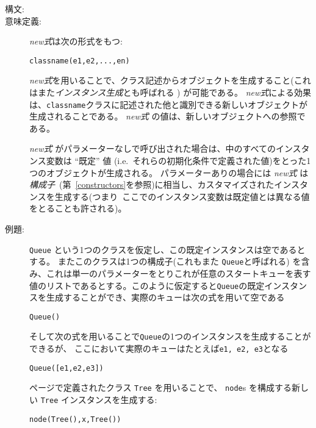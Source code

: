 \documentclass[\pformat,12pt]{jarticle}
\begin{document}
\begin{description}
\item[構文:] 

\item[意味定義:]  {\it new式}は次の形式をもつ:

  \begin{alltt}
     classname(e1, e2, ..., en)
  \end{alltt}
{\it new式}を用いることで、クラス記述からオブジェクトを生成すること(これはまた{\em インスタンス生成}とも呼ばれる ) が可能である。
 {\it new式}による効果は、{\tt classname}クラスに記述された他と識別できる新しいオブジェクトが生成されることである。
{\it new式} の値は、新しいオブジェクトへの参照である。

{\it new式} がパラメーターなしで呼び出された場合は、中のすべてのインスタンス変数は ``既定'' 値 (i.e.\ それらの初期化条件で定義された値)をとった1つのオブジェクトが生成される。
パラメーターありの場合には {\it new式} は  \emph{構成子}~(第~\ref{constructors}を参照)に相当し、カスタマイズされたインスタンスを生成する(つまり\ ここでのインスタンス変数は既定値とは異なる値をとることも許される)。


\item[例題:] \texttt{Queue} という1つのクラスを仮定し、この既定インスタンスは空であるとする。
 またこのクラスは1つの構成子(これもまた \texttt{Queue}と呼ばれる) を含み、これは単一のパラメーターをとりこれが任意のスタートキューを表す値のリストであるとする。このように仮定すると\texttt{Queue}の既定インスタンスを生成することができ、実際のキューは次の式を用いて空である
\begin{alltt}
   Queue()
\end{alltt}
そして次の式を用いることで\texttt{Queue}の1つのインスタンスを生成することができるが、 ここにおいて実際のキューはたとえば\texttt{e1, e2, e3}となる
\begin{alltt}
   Queue([e1, e2, e3])
\end{alltt}

 \pageref{TreeDef} ページで定義されたクラス \texttt{Tree} を用いることで、 \texttt{node}s を構成する新しい \texttt{Tree} インスタンスを生成する:
\begin{alltt}
node( Tree(), x,  Tree())
\end{alltt}
    
\end{description}
\end{document}
